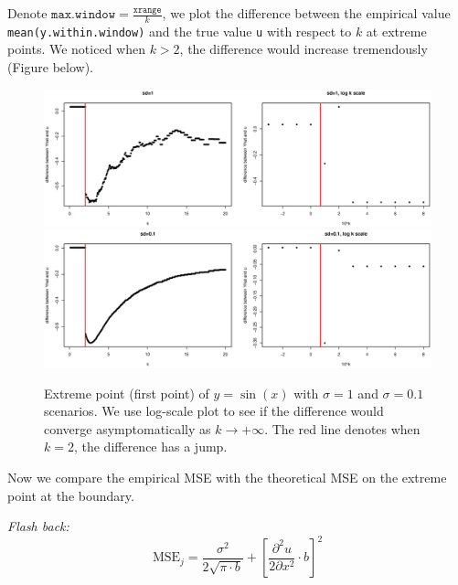 \documentclass{article}
\begin{document}
\begin{itemize}
Denote $\texttt{max.window} = \frac{\texttt{xrange}}{k}$, we plot the difference between the empirical value \texttt{mean(y.within.window)} and the true value \texttt{u} with respect to $k$ at extreme points. We noticed when $k>2$, the difference would increase tremendously (Figure below).

\begin{figure}[H]
\includegraphics[width=\linewidth]{pic/sim.plot4.eps}
\includegraphics[width=\linewidth]{pic/sim.plot5.eps}
\caption{Extreme point (first point) of $y=\sin(x)$ with $\sigma = 1$ and  $\sigma = 0.1$ scenarios. We use log-scale plot to see if the difference would converge asymptomatically as $k\rightarrow +\infty$. The red line denotes when $k=2$, the difference has a jump.} 
\end{figure}


Now we compare the empirical MSE with the theoretical MSE on the extreme point at the boundary. 

\textit{Flash back:}
$$\text{MSE}_j=  \frac{\sigma^2}{2\sqrt{\pi \cdot b}}  + \left[\frac{\partial^2 u}{2\partial x^2}\cdot b \right]^2$$


\end{itemize}
\end{document}
